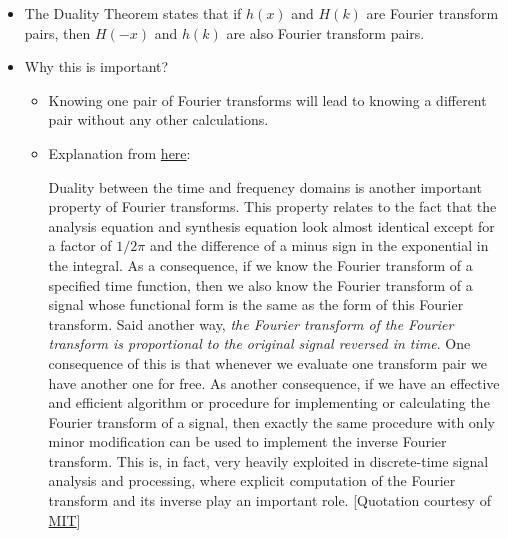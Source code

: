 \begin{itemize}
    \item The Duality Theorem states that if $h(x)$ and $H(k)$ are Fourier transform pairs, then $H(-x)$ and $h(k)$ are also Fourier transform pairs.

    \item Why this is important? 
    \begin{itemize}
        \item Knowing one pair of Fourier transforms will lead to knowing a different pair without any other calculations.
        
        \item Explanation from \href{https://ocw.mit.edu/resources/res-6-007-signals-and-systems-spring-2011/lecture-notes/MITRES_6_007S11_lec09.pdf}{here}: \\
        
            \begin{mdframed}[backgroundcolor=lightgray!20] 
                Duality between the time and frequency domains is another important
                property of Fourier transforms.
                This property relates to the fact that the analysis equation and synthesis equation look almost identical except for a factor
                of $1/2\pi$ and the difference of a minus sign in the exponential in the integral. 
                As a consequence, if we know the Fourier transform of a specified time function, then we also know the Fourier transform of a signal whose functional form is the same as the form of this Fourier transform. 
                Said another way, \textit{the Fourier
                transform of the Fourier transform is proportional to the original signal reversed
                in time}. 
                One consequence of this is that whenever we evaluate one
                transform pair we have another one for free.
                As another consequence, if we
                have an effective and efficient algorithm or procedure for implementing or
                calculating the Fourier transform of a signal, then exactly the same procedure
                with only minor modification can be used to implement the inverse Fourier
                transform. This is, in fact, very heavily exploited in discrete-time signal analysis
                and processing, where explicit computation of the Fourier transform and
                its inverse play an important role.
                [Quotation courtesy of \href{https://ocw.mit.edu/resources/res-6-007-signals-and-systems-spring-2011/lecture-notes/MITRES_6_007S11_lec09.pdf}{MIT}]
            \end{mdframed}
    

\end{itemize}
\end{itemize}
